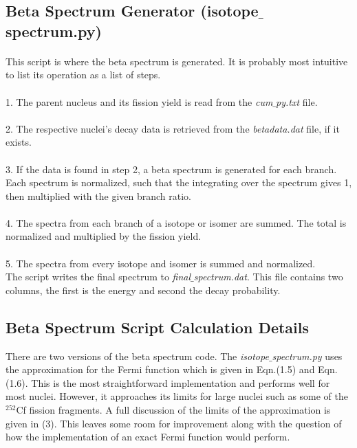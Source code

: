 \documentclass{report}
\begin{document}
\subsection{Beta Spectrum Generator (isotope$\_$spectrum.py)}
\paragraph{}
This script is where the beta spectrum is generated. It is probably most intuitive to list its operation as a list of steps. \\ \\
1. The parent nucleus and its fission yield is read from the \textit{cum$\_$py.txt} file.\\ \\
2. The respective nuclei's decay data is retrieved from the \textit{betadata.dat} file, if it exists.\\ \\
3. If the data is found in step 2, a beta spectrum is generated for each branch. Each spectrum is
 normalized, such that the integrating over the spectrum gives 1,  then multiplied with the given branch ratio.\\ \\
4. The spectra from each branch of a isotope or isomer are summed. The total is normalized and multiplied
by the fission yield. \\ \\
5. The spectra from every isotope and isomer is summed and normalized. \\ 

The script writes the final spectrum to \textit{final$\_$spectrum.dat}. This file contains two columns, the first is
the energy and second the decay probability. 

\subsection{Beta Spectrum Script Calculation Details}
There are two versions of the beta spectrum code. The \textit{isotope$\_$spectrum.py} uses the 
approximation for the Fermi function which is given in Eqn.(1.5) and Eqn.(1.6). This is the most 
straightforward implementation and performs well for most nuclei. However, it approaches its limits 
for large nuclei such as some of the  $^{252}$Cf fission fragments. A full discussion of the limits
of the approximation is given in (3). This leaves some room for improvement along with the 
question of how the implementation of an exact Fermi function would perform.
\end{document}

